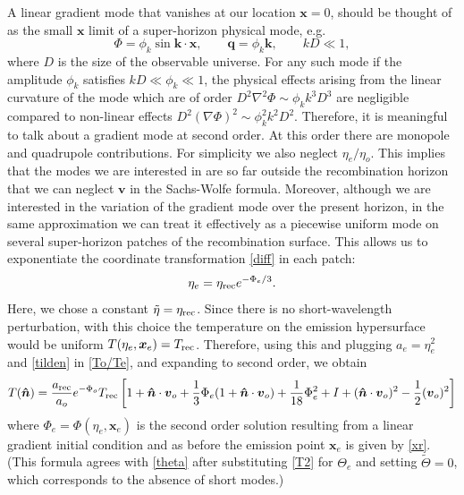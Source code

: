 \documentclass[12pt]{article}
\numberwithin{equation}{section}
\def\bsb{\boldsymbol}
\def\be{\begin{equation}}
\def\ee{\end{equation}}
\def\x{{\bsb x}}
\def\q{{\bsb q}}
\def\k{{\bsb k}}
\begin{document}
A linear gradient mode that vanishes at our location $\x=0$, should be thought of as the small $\x$ limit of a super-horizon physical mode, e.g.
\be
\Phi= \phi_k \sin \k\cdot \x,\qquad \q = \phi_k \k,\qquad kD\ll 1,
\ee
where $D$ is the size of the observable universe. For any such mode if the amplitude $\phi_k$ satisfies $kD\ll\phi_k\ll 1$, the physical effects arising from the linear curvature of the mode which are of order $D^2 \nabla^2 \Phi \sim\phi_k k^3 D^3$ are negligible compared to non-linear effects $D^2 (\nabla\Phi)^2\sim \phi_k^2 k^2 D^2$. Therefore, it is meaningful to talk about a gradient mode at second order. At this order there are monopole and quadrupole contributions. For simplicity we also neglect $\eta_e/\eta_o$. This implies that the modes we are interested in are so far outside the recombination horizon that we can neglect $\bsb v$ in the Sachs-Wolfe formula. Moreover, although we are interested in the variation of the gradient mode over the present horizon, in the same approximation we can treat it effectively as a piecewise uniform mode on several super-horizon patches of the recombination surface. This allows us to exponentiate the coordinate transformation \eqref{diff} in each patch:
\be
\eta_e = \eta_{\rm rec} e^{-\Phi_e/3}.
\ee
Here, we chose a constant $\tilde\eta=\eta_{\rm rec}$. Since there is no short-wavelength perturbation, with this choice the temperature on the emission hypersurface would be uniform $T(\eta_e,\x_e) = T_{\rm rec}$. Therefore, using this and plugging $a_e=\eta_e^2$ and \eqref{tilden} in \eqref{To/Te}, and expanding to second order, we obtain
\be
\label{T(n)}
T(\bsb{\hat n})
=\frac{a_{\rm rec}}{a_o} e^{-\Phi_o}T_{\rm rec}\left[1+\bsb{\hat n}\cdot \bsb v_o
+\frac{1}{3}\Phi_e(1+\bsb{\hat n}\cdot \bsb v_o)+\frac{1}{18}\Phi_e^2
+I+(\bsb{\hat n} \cdot \bsb v_o)^2-\frac{1}{2}(\bsb v_o)^2\right]\\[10pt]
\ee
where $\Phi_e=\Phi(\eta_e,\x_e)$ is the second order solution resulting from a linear gradient initial condition and as before the emission point $\x_e$ is given by \eqref{xr}. (This formula agrees with \eqref{theta} after substituting \eqref{T2} for $\Theta_e$ and setting $\tilde\Theta=0$, which corresponds to the absence of short modes.) 
\end{document}
